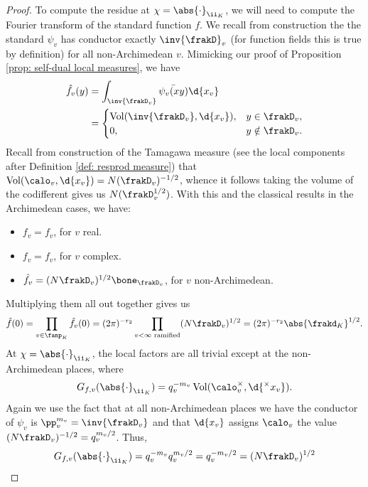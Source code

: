 \documentclass[11pt, x11names, openany]{book}
\begin{document}
\begin{proof}
To compute the residue at $\chi = \abs{\cdot}_{\ii_K}$, we will need to compute the Fourier transform of the standard function $f$. We recall from construction the the standard $\psi_v$ has conductor exactly $\inv{\frakD}_v$ (for function fields this is true by definition) for all non-Archimedean $v$. Mimicking our proof of Proposition \ref{prop: self-dual local measures}, we have
\begin{align*}
\hat{f_v}(y) &= \int_{\inv{\frakD_v}} \bar{\psi_v(xy)} \d{x_v}\\
&= \begin{cases}
\vol(\inv{\frakD_v}, \d{x_v}), & y \in \frakD_v,\\
0, & y \notin \frakD_v.
\end{cases}
\end{align*}
Recall from construction of the Tamagawa measure (see the local components after Definition \ref{def: resprod measure}) that $\vol(\calo_v, \d{x_v}) = N(\frakD_v)^{-1/2}$, whence it follows taking the volume of the codifferent gives us $N(\frakD_v^{1/2})$. With this and the classical results in the Archimedean cases, we have:
\begin{itemize}
    \item $\hat{f_v} = f_v$, for $v$ real.
    \item $\hat{f_v} = f_v$, for $v$ complex.
    \item $\hat{f_v} = (N \frakD_v)^{1/2} \bone_{\frakD_v}$, for $v$ non-Archimedean.
\end{itemize} 
Multiplying them all out together gives us
\begin{equation}
    \label{eqn: fourier transform of standard func at 0}
    \hat{f}(0) = \prod_{v \in \fanp_K} \hat{f_v}(0) = (2 \pi)^{-r_2} \prod_{v < \infty \text{ ramified}} (N \frakD_v)^{1/2} = (2\pi)^{- r_2} \abs{\frakd_K}^{1/2}.
\end{equation}
 At $\chi = \abs{\cdot}_{\ii_K}$, the local factors are all trivial except at the non-Archimedean places, where
\begin{equation*}
    G_{f, v}(\abs{\cdot}_{\ii_K}) = q_v^{-m_v} \vol(\calo_v^\times, \d{^\times x_v}).
\end{equation*}
Again we use the fact that at all non-Archimedean places we have the conductor of $\psi_v$ is $\pp_v^{m_v} = \inv{\frakD_v}$ and that $\d{x_v}$ assigns $\calo_v$ the value $(N \frakD_v)^{-1/2} = q_v^{m_v/2}$. Thus,  
\begin{equation*}
    G_{f, v}(\abs{\cdot}_{\ii_K}) = q_v^{-m_v} q_v^{m_v/2} = q_v^{-m_v/2} = (N \frakD_v)^{1/2} 

\end{equation*}
\end{proof}
\end{document}
